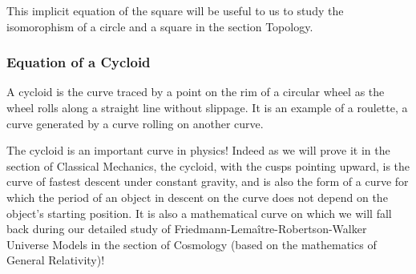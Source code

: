 	This implicit equation of the square will be useful to us to study the isomorophism of a circle and a square in the section Topology.
	
	\subsubsection{Equation of a Cycloid}\label{cycloid curve}
	A cycloid is the curve traced by a point on the rim of a circular wheel as the wheel rolls along a straight line without slippage. It is an example of a roulette, a curve generated by a curve rolling on another curve.

	The cycloid is an important curve in physics! Indeed as we will prove it in the section of Classical Mechanics, the cycloid, with the cusps pointing upward, is the curve of fastest descent under constant gravity, and is also the form of a curve for which the period of an object in descent on the curve does not depend on the object's starting position. It is also a mathematical curve on which we will fall back during our detailed study of Friedmann-Lemaître-Robertson-Walker Universe Models in the section of Cosmology (based on the mathematics of General Relativity)!

